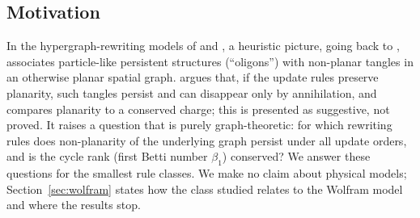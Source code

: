 \documentclass[10pt]{article}
\theoremstyle{definition}
\theoremstyle{plain}
\theoremstyle{remark}
\newcommand{\Betti}{\beta_1}
\begin{document}
\subsection{Motivation}
In the hypergraph-rewriting models of \citet{wolfram2020project} and \citet{gorard2020relativistic,gorard2020quantum}, a heuristic picture, going back to \citet{wolfram2002nks}, associates particle-like persistent structures (``oligons'') with non-planar tangles in an otherwise planar spatial graph. \citet[\S2.4]{gorard2020relativistic} argues that, if the update rules preserve planarity, such tangles persist and can disappear only by annihilation, and compares planarity to a conserved charge; this is presented as suggestive, not proved. It raises a question that is purely graph-theoretic: for which rewriting rules does non-planarity of the underlying graph persist under all update orders, and is the cycle rank (first Betti number $\Betti$) conserved? We answer these questions for the smallest rule classes. We make no claim about physical models; Section~\ref{sec:wolfram} states how the class studied relates to the Wolfram model and where the results stop.
\end{document}
